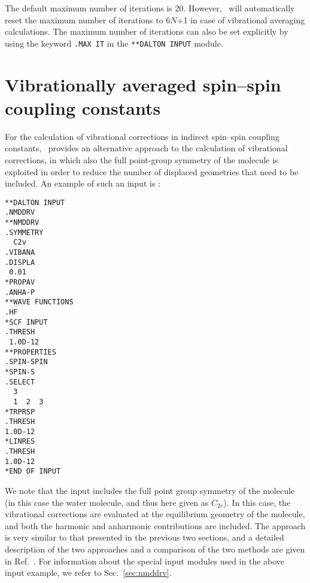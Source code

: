 The default maximum number of iterations is 20. However, \dalton\ will
automatically reset the maximum number of iterations to 6$N$+1 in case
of vibrational averaging calculations. The maximum number of
iterations can also be set explicitly by using
the keyword \verb|.MAX IT| in the \verb|**DALTON INPUT| module.

\section{Vibrationally averaged spin--spin coupling constants}

For the calculation of vibrational corrections in indirect spin--spin
coupling constants, \dalton\ provides an alternative approach to the
calculation of vibrational corrections, in which also the full
point-group symmetry of the molecule is exploited in order to
reduce the number of displaced geometries that need to be included. An
example of such an input is :

\begin{verbatim}
**DALTON INPUT
.NMDDRV
**NMDDRV
.SYMMETRY
  C2v
.VIBANA
.DISPLA
 0.01
*PROPAV
.ANHA-P
**WAVE FUNCTIONS
.HF
*SCF INPUT
.THRESH
 1.0D-12
**PROPERTIES
.SPIN-SPIN
*SPIN-S
.SELECT
  3
  1  2  3
*TRPRSP
.THRESH
1.0D-12
*LINRES
.THRESH
1.0D-12
*END OF INPUT
\end{verbatim}

We note that the input includes the full point group symmetry of the
molecule (in this case the water molecule, and thus here given as
$C_{2v}$). In this case, the vibrational corrections are evaluated at
the equilibrium geometry of the molecule, and both the harmonic and
anharmonic contributions are included. The approach is very similar to
that presented in the previous two sections, and a detailed
description of the two approaches and a comparison of the two methods
are given in Ref.~\cite{XXXXXX}. For information about the special input
modules used in the above input example, we refer to
Sec.~\ref{sec:nmddrv}. 
